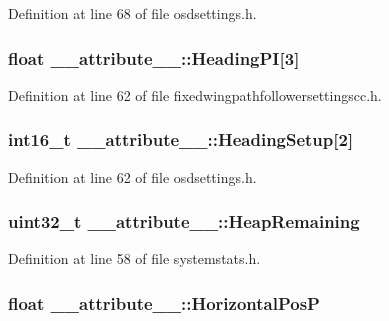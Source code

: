 \-Definition at line 68 of file osdsettings.\-h.

\hypertarget{struct____attribute_____aea876ad21cec8fc5d424692e080f189d}{
\subsubsection[{\-Heading\-P\-I}]{\setlength{\rightskip}{0pt plus 5cm}float {\bf \-\_\-\-\_\-attribute\-\_\-\-\_\-\-::\-Heading\-P\-I}\mbox{[}3\mbox{]}}}\label{struct____attribute_____aea876ad21cec8fc5d424692e080f189d}


\-Definition at line 62 of file fixedwingpathfollowersettingscc.\-h.

\hypertarget{struct____attribute_____a318b4ac138ca7887757094f7bbf602d0}{
\subsubsection[{\-Heading\-Setup}]{\setlength{\rightskip}{0pt plus 5cm}int16\-\_\-t {\bf \-\_\-\-\_\-attribute\-\_\-\-\_\-\-::\-Heading\-Setup}\mbox{[}2\mbox{]}}}\label{struct____attribute_____a318b4ac138ca7887757094f7bbf602d0}


\-Definition at line 62 of file osdsettings.\-h.

\hypertarget{struct____attribute_____a7974fd00ac400284a9630e0965818a94}{
\subsubsection[{\-Heap\-Remaining}]{\setlength{\rightskip}{0pt plus 5cm}uint32\-\_\-t {\bf \-\_\-\-\_\-attribute\-\_\-\-\_\-\-::\-Heap\-Remaining}}}\label{struct____attribute_____a7974fd00ac400284a9630e0965818a94}


\-Definition at line 58 of file systemstats.\-h.

\hypertarget{struct____attribute_____a0aec3de4e46f73750728f57628963926}{
\subsubsection[{\-Horizontal\-Pos\-P}]{\setlength{\rightskip}{0pt plus 5cm}float {\bf \-\_\-\-\_\-attribute\-\_\-\-\_\-\-::\-Horizontal\-Pos\-P}}}\label{struct____attribute_____a0aec3de4e46f73750728f57628963926}


